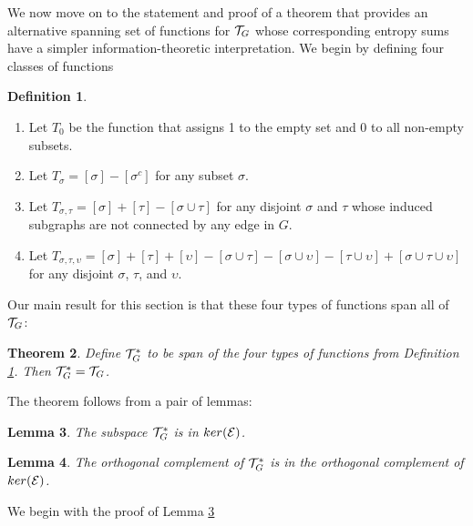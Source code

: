 \documentclass[12pt]{article}
\newtheorem{theorem}{Theorem}[section]
\newtheorem{lemma}[theorem]{Lemma}
\theoremstyle{definition}
\newtheorem{definition}[theorem]{Definition}
\begin{document}
We now move on to the statement and proof of a theorem that provides an alternative spanning set of functions for ${\cal T}_G$ whose corresponding entropy sums have a simpler information-theoretic interpretation. We begin by defining four classes of functions
\begin{definition}\label{def:T14}
\begin{enumerate}
    \item Let $T_0$ be the function that assigns 1 to the empty set and 0 to all non-empty subsets.
    \item Let $T_\sigma = [\sigma] - [\sigma^c]$ for any subset $\sigma$.
    \item Let $T_{\sigma,\tau} = [\sigma] + [\tau] - [\sigma \cup \tau]$ for any disjoint $\sigma$ and $\tau$ whose induced subgraphs are not connected by any edge in $G$. 
    \item Let $T_{\sigma,\tau,\upsilon} = [\sigma] + [\tau]  + [\upsilon] - [\sigma \cup \tau ] - [\sigma\cup \upsilon] -[ \tau \cup \upsilon] + [\sigma \cup \tau \cup \upsilon]$ for any disjoint $\sigma$, $\tau$, and $\upsilon$. 
\end{enumerate}
\end{definition}
Our main result for this section is that these four types of functions span all of ${\cal T}_G$:
\begin{theorem}
\label{thm:Möbius}
    Define ${\cal T}_G^*$ to be span of the four types of functions from Definition \ref{def:T14}. Then ${\cal T}_G^* = {\cal T}_G$. 
\end{theorem}
The theorem follows from a pair of lemmas:
\begin{lemma}
\label{lem:inkernel}
    The subspace ${\cal T}_G^*$ is in $ker({\cal E})$. 
\end{lemma}
\begin{lemma}
\label{complemma}
The orthogonal complement of ${\cal T}_G^*$ is in the orthogonal complement of $ker({\cal E})$.
\end{lemma}
We begin with the proof of Lemma \ref{lem:inkernel}
\end{document}
